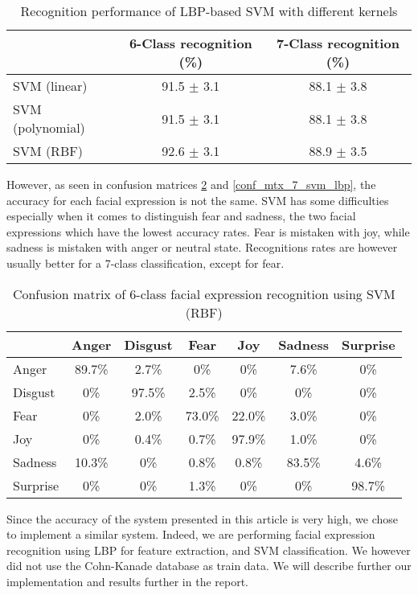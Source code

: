\begin{table}[h]
\begin{tabular}{|lcc|}
\hline
 & 6-Class recognition (\%) &  7-Class recognition (\%) \\
 \hline
 SVM (linear) & 91.5 $\pm$ 3.1 & 88.1 $\pm$ 3.8 \\
 SVM (polynomial) & 91.5 $\pm$ 3.1 & 88.1 $\pm$ 3.8 \\
 SVM (RBF) & 92.6 $\pm$ 3.1 & 88.9 $\pm$ 3.5 \\
 \hline
\end{tabular}
\caption{\label{accuracy_svm_lbp} Recognition performance of LBP-based SVM with different kernels}
\end{table}

\noindent However, as seen in confusion matrices \ref{conf_mtx_6_svm_lbp} and \ref{conf_mtx_7_svm_lbp}, the accuracy for each facial expression is not the same. SVM has some difficulties especially when it comes to distinguish fear and sadness, the two facial expressions which have the lowest accuracy rates. Fear is mistaken with joy, while sadness is mistaken with anger or neutral state. Recognitions rates are however usually better for a 7-class classification, except for fear.
\newline

\begin{table}[h]
\begin{tabular}{|lcccccc|}
\hline
 & Anger & Disgust & Fear & Joy & Sadness & Surprise \\
\hline
Anger & 89.7\% & 2.7\% & 0\% & 0\% & 7.6\% & 0\% \\
Disgust & 0\% & 97.5\% & 2.5\% & 0\% & 0\% & 0\% \\
Fear & 0\% & 2.0\% & 73.0\% & 22.0\% & 3.0\% & 0\% \\
Joy & 0\% & 0.4\% & 0.7\% & 97.9\% & 1.0\% & 0\% \\
Sadness & 10.3\% & 0\% & 0.8\% & 0.8\% & 83.5\% & 4.6\% \\
Surprise & 0\% & 0\% & 1.3\% & 0\% & 0\% & 98.7\% \\
\hline
\end{tabular}
\caption{\label{conf_mtx_6_svm_lbp} Confusion matrix of 6-class facial expression recognition using SVM (RBF)}
\end{table}

\noindent Since the accuracy of the system presented in this article is very high, we chose to implement a similar system. Indeed, we are performing facial expression recognition using LBP for feature extraction, and SVM classification. We however did not use the Cohn-Kanade database as train data. We will describe further our implementation and results further in the report. 
\newline

